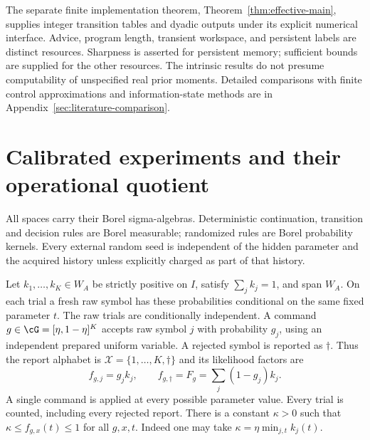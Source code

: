 \documentclass[11pt]{amsart}
\theoremstyle{definition}\newtheorem{definition}[theorem]{Definition}
\theoremstyle{remark}\newtheorem{remark}[theorem]{Remark}
\newcommand{\cX}{\mathcal X}\newcommand{\cS}{\mathcal S}
\begin{document}
The separate finite implementation theorem,
Theorem~\ref{thm:effective-main}, supplies integer transition tables and
dyadic outputs under its explicit numerical interface. Advice, program
length, transient workspace, and persistent labels are distinct resources.
Sharpness is asserted for persistent memory; sufficient bounds are
supplied for the other resources. The intrinsic results do not presume
computability of unspecified real prior moments. Detailed comparisons
with finite control approximations and information-state methods are in
Appendix~\ref{sec:literature-comparison}.

\section{Calibrated experiments and their operational quotient}\label{sec:experiment}
All spaces carry their Borel sigma-algebras. Deterministic continuation,
transition and decision rules are Borel measurable; randomized rules are
Borel probability kernels. Every external random seed is independent of
the hidden parameter and the acquired history unless explicitly charged
as part of that history.

Let $k_1,\ldots,k_K\in W_A$ be strictly positive on $I$, satisfy
$\sum_jk_j=1$, and span $W_A$. On each trial a fresh raw symbol has these
probabilities conditional on the same fixed parameter $t$. The raw trials
are conditionally independent. A command
$g\in\cG=[\eta,1-\eta]^K$ accepts raw symbol $j$ with probability $g_j$,
using an independent prepared uniform variable. A rejected symbol is
reported as $\dagger$. Thus the report alphabet is
$\cX=\{1,\ldots,K,\dagger\}$ and its likelihood factors are
\begin{equation}\label{eq:channel}
 f_{g,j}=g_jk_j,\qquad
 f_{g,\dagger}=F_g=\sum_j(1-g_j)k_j.
\end{equation}
A single command is applied at every possible parameter value. Every
trial is counted, including every rejected report. There is a constant
$\kappa>0$ such that $\kappa\le f_{g,x}(t)\le1$ for all $g,x,t$.
Indeed one may take $\kappa=\eta\min_{j,t}k_j(t)$.
\end{document}
